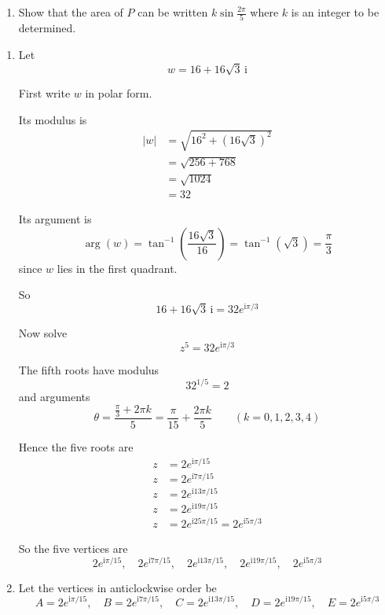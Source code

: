 \documentclass[leqno]{article}
\begin{document}
\begin{enumerate}[
  label=\textbf{\arabic*.},
  leftmargin=*,
  topsep=0pt,
  partopsep=0pt,
  parsep=0pt
]
\begin{enumerate}
    \item Show that the area of $P$ can be written $k\sin\frac{2\pi}{5} $ where $k$ is an integer to be determined. 

\end{enumerate}

\vspace*{30pt}

\begin{tcolorbox}[colback=white, colframe=scarlet, title={\textbf{Solution}}, breakable, grow to left by=6mm, grow to right by=10mm]
\begin{enumerate}[label=\textbf{(\alph*)}]
  \item Let
\[
w=16+16\sqrt{3}\,\mathrm{i}
\]

First write $w$ in polar form.

Its modulus is
\begin{align*}
|w|
&=\sqrt{16^2+(16\sqrt{3})^2} \\
&=\sqrt{256+768} \\
&=\sqrt{1024} \\
&=32
\end{align*}

Its argument is
\[
\arg(w)=\tan^{-1}\!\left(\frac{16\sqrt{3}}{16}\right)=\tan^{-1}(\sqrt{3})=\frac{\pi}{3}
\]
since $w$ lies in the first quadrant.

So
\[
16+16\sqrt{3}\,\mathrm{i}=32e^{\mathrm{i}\pi/3}
\]

Now solve
\[
z^5=32e^{\mathrm{i}\pi/3}
\]

The fifth roots have modulus
\[
32^{1/5}=2
\]
and arguments
\[
\theta=\frac{\frac{\pi}{3}+2\pi k}{5}=\frac{\pi}{15}+\frac{2\pi k}{5}
\qquad (k=0,1,2,3,4)
\]

Hence the five roots are
\begin{align*}
z&=2e^{\mathrm{i}\pi/15} \\
z&=2e^{\mathrm{i}7\pi/15} \\
z&=2e^{\mathrm{i}13\pi/15} \\
z&=2e^{\mathrm{i}19\pi/15} \\
z&=2e^{\mathrm{i}25\pi/15}=2e^{\mathrm{i}5\pi/3}
\end{align*}

So the five vertices are
\[
2e^{\mathrm{i}\pi/15},\quad
2e^{\mathrm{i}7\pi/15},\quad
2e^{\mathrm{i}13\pi/15},\quad
2e^{\mathrm{i}19\pi/15},\quad
2e^{\mathrm{i}5\pi/3}
\]

  \item Let the vertices in anticlockwise order be
\[
A=2e^{\mathrm{i}\pi/15},\quad
B=2e^{\mathrm{i}7\pi/15},\quad
C=2e^{\mathrm{i}13\pi/15},\quad
D=2e^{\mathrm{i}19\pi/15},\quad
E=2e^{\mathrm{i}5\pi/3}
\]


\end{enumerate}
\end{tcolorbox}
\end{enumerate}
\end{document}
